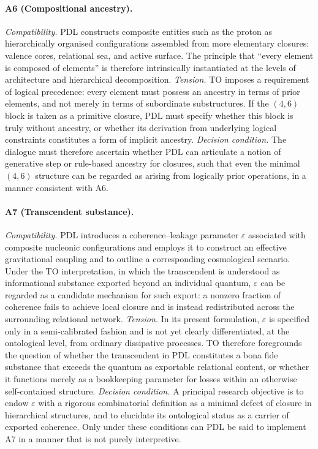 \documentclass[11pt,a4paper]{article}
\begin{document}
\paragraph{A6 (Compositional ancestry).}
\emph{Compatibility.} PDL constructs composite entities such as the proton as hierarchically organised configurations assembled from more elementary closures: valence cores, relational sea, and active surface. The principle that “every element is composed of elements” is therefore intrinsically instantiated at the levels of architecture and hierarchical decomposition.  
\emph{Tension.} TO imposes a requirement of logical precedence: every element must possess an ancestry in terms of prior elements, and not merely in terms of subordinate substructures. If the \((4,6)\) block is taken as a primitive closure, PDL must specify whether this block is truly without ancestry, or whether its derivation from underlying logical constraints constitutes a form of implicit ancestry.  
\emph{Decision condition.} The dialogue must therefore ascertain whether PDL can articulate a notion of generative step or rule-based ancestry for closures, such that even the minimal \((4,6)\) structure can be regarded as arising from logically prior operations, in a manner consistent with A6.

\paragraph{A7 (Transcendent substance).}
\emph{Compatibility.} PDL introduces a coherence–leakage parameter \(\varepsilon\) associated with composite nucleonic configurations and employs it to construct an effective gravitational coupling and to outline a corresponding cosmological scenario. Under the TO interpretation, in which the transcendent is understood as informational substance exported beyond an individual quantum, \(\varepsilon\) can be regarded as a candidate mechanism for such export: a nonzero fraction of coherence fails to achieve local closure and is instead redistributed across the surrounding relational network.  
\emph{Tension.} In its present formulation, \(\varepsilon\) is specified only in a semi-calibrated fashion and is not yet clearly differentiated, at the ontological level, from ordinary dissipative processes. TO therefore foregrounds the question of whether the transcendent in PDL constitutes a bona fide substance that exceeds the quantum as exportable relational content, or whether it functions merely as a bookkeeping parameter for losses within an otherwise self-contained structure.  
\emph{Decision condition.} A principal research objective is to endow \(\varepsilon\) with a rigorous combinatorial definition as a minimal defect of closure in hierarchical structures, and to elucidate its ontological status as a carrier of exported coherence. Only under these conditions can PDL be said to implement A7 in a manner that is not purely interpretive.
\end{document}
